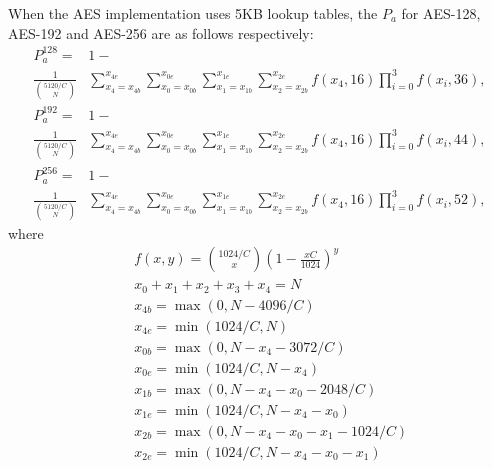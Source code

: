 When the AES implementation uses 5KB lookup tables, the $P_{a}$ for AES-128, AES-192 and AES-256 are as follows respectively:
\begin{align}
    P_{a}^{128} = &1-   \nonumber \\
    \frac{1}{\binom{5120/C}{N}}&\sum_{x_4=x_{4b}}^{x_{4e}}{\sum_{x_0=x_{0b}}^{x_{0e}}{\sum_{x_1=x_{1b}}^{x_{1e}}{ \sum_{x_2=x_{2b}}^{x_{2e}}{f(x_4,16)\prod_{i=0}^{3}{f(x_i,36)}}}}}, \nonumber
\end{align}
\begin{align}
    P_{a}^{192} = &1-  \nonumber \\
    \frac{1}{\binom{5120/C}{N}}&\sum_{x_4=x_{4b}}^{x_{4e}}{\sum_{x_0=x_{0b}}^{x_{0e}}{\sum_{x_1=x_{1b}}^{x_{1e}}{ \sum_{x_2=x_{2b}}^{x_{2e}}{f(x_4,16)\prod_{i=0}^{3}{f(x_i,44)}}}}}, \nonumber
\end{align}
\begin{align}
    P_{a}^{256} = &1-  \nonumber \\
    \frac{1}{\binom{5120/C}{N}}&\sum_{x_4=x_{4b}}^{x_{4e}}{\sum_{x_0=x_{0b}}^{x_{0e}}{\sum_{x_1=x_{1b}}^{x_{1e}}{ \sum_{x_2=x_{2b}}^{x_{2e}}{f(x_4,16)\prod_{i=0}^{3}{f(x_i,52)}}}}}, \nonumber
\end{align}
where
  \begin{eqnarray*}
    &&f(x,y) = \binom{1024/C}{x}(1-\frac{xC}{1024})^{y} \\
    &&x_0+x_1+x_2+x_3+x_4 = N \\
    &&x_{4b} = \max(0,N-4096/C) \\
    &&x_{4e} = \min(1024/C,N) \\
    &&x_{0b} = \max(0,N-x_4-3072/C) \\
    &&x_{0e} = \min(1024/C,N-x_4) \\
    &&x_{1b} = \max(0,N-x_4-x_0-2048/C) \\
    &&x_{1e} = \min(1024/C,N-x_4-x_0) \\
    &&x_{2b} = \max(0,N-x_4-x_0-x_1-1024/C) \\
    &&x_{2e} = \min(1024/C,N-x_4-x_0-x_1)
  \end{eqnarray*}

